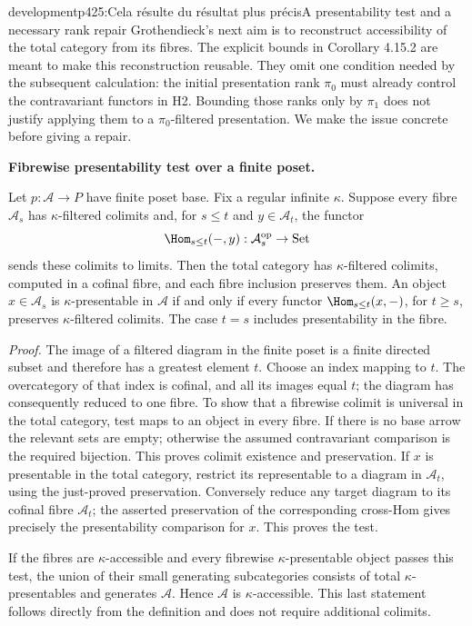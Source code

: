 \begin{dcomment}{development}{p425:Cela résulte du résultat plus précis}{A presentability test and a necessary rank repair}
Grothendieck's next aim is to reconstruct accessibility of the total category from its fibres. The explicit bounds in Corollary 4.15.2 are meant to make this reconstruction reusable. They omit one condition needed by the subsequent calculation: the initial presentation rank $\pi_0$ must already control the contravariant functors in H2. Bounding those ranks only by $\pi_1$ does not justify applying them to a $\pi_0$-filtered presentation. We make the issue concrete before giving a repair.

\textbf{Fibrewise presentability test over a finite poset.}\ours\ 

Let $p:\mathcal A\to P$ have finite poset base. Fix a regular infinite $\kappa$. Suppose every fibre $\mathcal A_s$ has $\kappa$-filtered colimits and, for $s\leq t$ and $y\in\mathcal A_t$, the functor
\[
 \Hom_{s\leq t}(-,y):\mathcal A_s^{\mathrm{op}}\to\mathrm{Set}
\]
sends these colimits to limits. Then the total category has $\kappa$-filtered colimits, computed in a cofinal fibre, and each fibre inclusion preserves them. An object $x\in\mathcal A_s$ is $\kappa$-presentable in $\mathcal A$ if and only if every functor $\Hom_{s\leq t}(x,-)$, for $t\geq s$, preserves $\kappa$-filtered colimits. The case $t=s$ includes presentability in the fibre.

\emph{Proof.} The image of a filtered diagram in the finite poset is a finite directed subset and therefore has a greatest element $t$. Choose an index mapping to $t$. The overcategory of that index is cofinal, and all its images equal $t$; the diagram has consequently reduced to one fibre. To show that a fibrewise colimit is universal in the total category, test maps to an object in every fibre. If there is no base arrow the relevant sets are empty; otherwise the assumed contravariant comparison is the required bijection. This proves colimit existence and preservation. If $x$ is presentable in the total category, restrict its representable to a diagram in $\mathcal A_t$, using the just-proved preservation. Conversely reduce any target diagram to its cofinal fibre $\mathcal A_t$; the asserted preservation of the corresponding cross-Hom gives precisely the presentability comparison for $x$. This proves the test.

If the fibres are $\kappa$-accessible and every fibrewise $\kappa$-presentable object passes this test, the union of their small generating subcategories consists of total $\kappa$-presentables and generates $\mathcal A$. Hence $\mathcal A$ is $\kappa$-accessible. This last statement follows directly from the definition and does not require additional colimits.


\end{dcomment}
